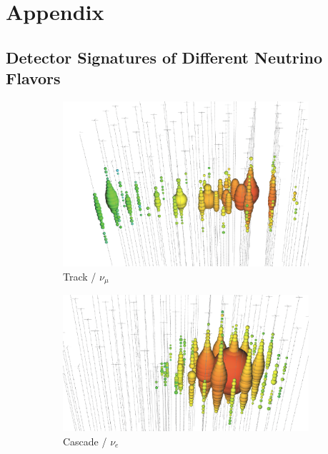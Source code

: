 \chapter{Appendix}

\section{Detector Signatures of Different Neutrino Flavors}
\begin{figure}
  \centering
  \begin{subfigure}{0.3\textwidth}
    \centering
    \includegraphics[width=\textwidth]{content/img/signatures/track.png}
    \caption{
        Track / $\nu_\mu$
    }
  \end{subfigure}
  \begin{subfigure}{0.3\textwidth}
    \centering
    \includegraphics[width=\textwidth]{content/img/signatures/cascade.png}
    \caption{
        Cascade / $\nu_e$
    }
  \end{subfigure}
  \begin{subfigure}{0.3\textwidth}

\end{subfigure}
\end{figure}
